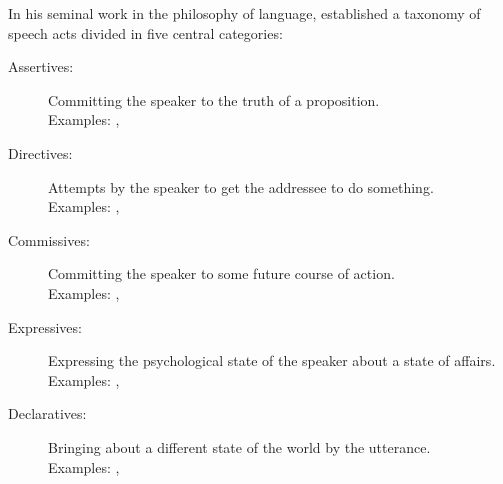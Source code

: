 In his seminal work in the philosophy of language, \cite{searle1975taxonomy} established a taxonomy of speech acts divided in five central categories:
\begin{description}
\item[Assertives: ] Committing the speaker to the truth of a proposition. \\
Examples: , 
\item[Directives: ]  Attempts by the speaker to get the addressee to do something. \\ Examples:  , 
\item[Commissives: ] Committing the speaker to some future course of action. \\ Examples: , 
\item[Expressives: ] Expressing the psychological state of the speaker about a state of affairs. \\ Examples: , 
\item[Declaratives: ] Bringing about a different state of the world by the utterance. \\ Examples: , 
\end{description}

